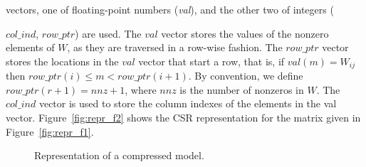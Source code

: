 vectors, one of  floating-point numbers ({\em val}), and the other two of integers ({$col\_ind$, $row\_ptr$) are used. The $val$ vector stores the values of the nonzero elements of $W$, as they are traversed in a row-wise fashion.  The $row\_ptr$ vector stores the locations in the $val$ vector that start a row, that is, if $val(m)=W_{ij}$ then $row\_ptr(i) \leq m < row\_ptr(i+1)$. By convention, we define $row\_ptr(r+1) =nnz+1$, where $nnz$ is the number of nonzeros in $W$. The $col\_ind$ vector is used to store the column indexes of the elements in the val vector.   
 Figure~\ref{fig:repr_f2} shows the CSR representation for the matrix given in 
Figure~\ref{fig:repr_f1}.

\begin{figure*}[!tbp]
  \centering
  \hfill
  \hfill
  \hfill
  \hfill
  \caption{Representation of a compressed model.}
\end{figure*}

}
